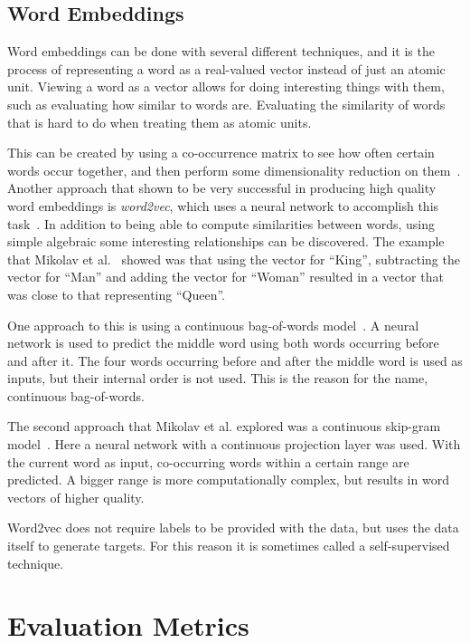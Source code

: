 \subsection{Word Embeddings}

Word embeddings can be done with several different techniques, and it is the process of representing a word as a real-valued vector instead of just an atomic unit.
Viewing a word as a vector allows for doing interesting things with them, such as evaluating how similar to words are.
Evaluating the similarity of words that is hard to do when treating them as atomic units.

This can be created by using a co-occurrence matrix to see how often certain words occur together, and then perform some dimensionality reduction on them~\cite{lebret2013word, levy2014neural}.
Another approach that shown to be very successful in producing high quality word embeddings is \textit{word2vec}, which uses a neural network to accomplish this task~\cite{mikolov2013efficient}.
In addition to being able to compute similarities between words, using simple algebraic some interesting relationships can be discovered.
The example that Mikolav et al\@.~\cite{mikolov2013efficient} showed was that using the vector for ``King'', subtracting the vector for ``Man'' and adding the vector for ``Woman'' resulted in a vector that was close to that representing ``Queen''.

One approach to this is using a continuous bag-of-words model~\cite{mikolov2013efficient}.
A neural network is used to predict the middle word using both words occurring before and after it.
The four words occurring before and after the middle word is used as inputs, but their internal order is not used.
This is the reason for the name, continuous bag-of-words.

The second approach that Mikolav et al\@. explored was a continuous skip-gram model~\cite{mikolov2013efficient}.
Here a neural network with a continuous projection layer was used.
With the current word as input, co-occurring words within a certain range are predicted.
A bigger range is more computationally complex, but results in word vectors of higher quality.

Word2vec does not require labels to be provided with the data, but uses the data itself to generate targets.
For this reason it is sometimes called a self-supervised technique.

\section{Evaluation Metrics}\label{sec:evaluation-metrics}


